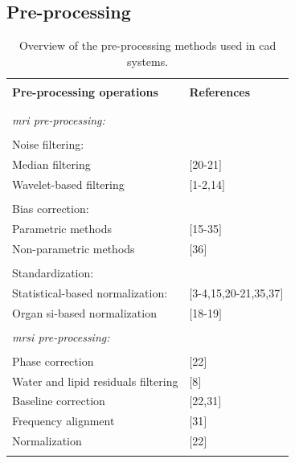 \def\rmm#1{{\bf \sc Robert: }{\marrow\sf #1}}


\subsection{Pre-processing} \label{subsec:preprocessing}

\begin{table}
	\caption{Overview of the pre-processing methods used in \ac{cad} systems.}
	\small
	\begin{tabular}{p{.65\linewidth} p{.25\linewidth}}
		\hline \\ [-1.5ex]
		\textbf{Pre-processing operations} & \textbf{References} \\ \\ [-1.5ex]
		\hline \\ [-1.5ex]
		\textit{\ac{mri} pre-processing:} & \\ \\ [-1.5ex]
		\quad Noise filtering: &  \\
		\quad \quad Median filtering & $[$20-21$]$  \\
		\quad \quad Wavelet-based filtering & $[$1-2,14$]$ \\ \\ [-1.5ex]
		\quad Bias correction: & \\
		\quad \quad Parametric methods & $[$15-35$]$ \\
		\quad \quad Non-parametric methods & $[$36$]$ \\ \\ [-1.5ex]
		\quad Standardization: & \\
		\quad \quad Statistical-based normalization: & $[$3-4,15,20-21,35,37$]$ \\
		\quad \quad Organ \ac{si}-based normalization & $[$18-19$]$ \\ \\ [-1.5ex]
		\textit{\ac{mrsi} pre-processing:} & \\ \\ [-1.5ex]
		\quad Phase correction & $[$22$]$ \\
		\quad Water and lipid residuals filtering & $[$8$]$ \\
		\quad Baseline correction & $[$22,31$]$ \\
		\quad Frequency alignment & $[$31$]$ \\
		\quad Normalization & $[$22$]$ \\ \\ [-1.5ex]
		\hline
	\end{tabular}
\end{table}

